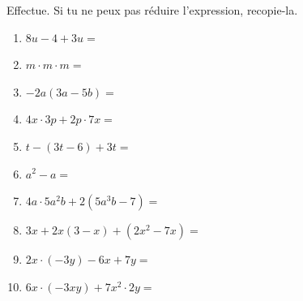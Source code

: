 %
%
    Effectue. Si tu ne peux pas réduire l'expression, recopie-la.
    \begin{enumerate}[itemsep=2.2cm]
        \item \(8u-4+3u=\)
        \item \(m\cdot m \cdot m =\)
        \item \(-2a(3a-5b)=\)
        \item \(4x\cdot 3p + 2p \cdot 7x=\)
        \item \(t-(3t-6) + 3t=\)
        \item \(a^2 - a=\)
        \item \(4a\cdot 5a^2b + 2(5a^3b -7)=\)
        \item \(3x + 2x(3-x) + (2x^2-7x)=\)
        \item \(2x \cdot (-3y) - 6x + 7y=\)
        \item \(6x \cdot (-3xy) + 7x^2 \cdot 2y=\)
    \end{enumerate}
    \vspace*{2cm}
